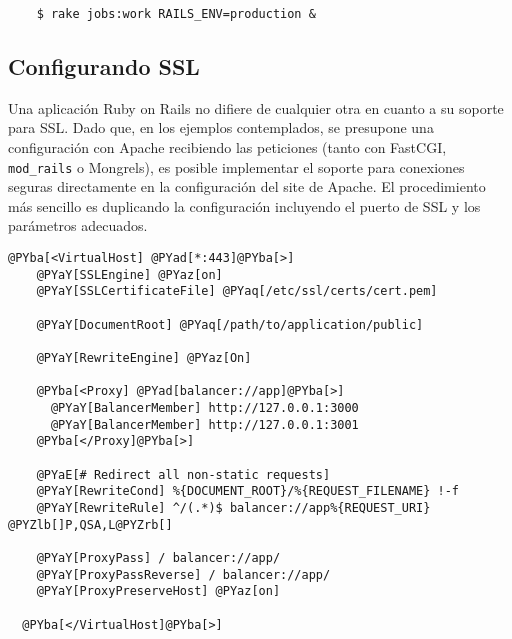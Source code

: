 \begin{verbatim}
	$ rake jobs:work RAILS_ENV=production &
\end{verbatim}


\subsection{Configurando SSL} %
\label{sub:configurando_ssl}

Una aplicación Ruby on Rails no difiere de cualquier otra en cuanto a su soporte para SSL. Dado que, en los ejemplos contemplados, se presupone una configuración con Apache recibiendo las peticiones (tanto con FastCGI, \texttt{mod\_rails} o Mongrels), es posible implementar el soporte para conexiones seguras directamente en la configuración del site de Apache. El procedimiento más sencillo es duplicando la configuración incluyendo el puerto de SSL y los parámetros adecuados.

%
%
%
%    
%
%

\begin{Verbatim}[commandchars=@\[\]]
  @PYba[<VirtualHost] @PYad[*:443]@PYba[>]
    @PYaY[SSLEngine] @PYaz[on]
    @PYaY[SSLCertificateFile] @PYaq[/etc/ssl/certs/cert.pem]

    @PYaY[DocumentRoot] @PYaq[/path/to/application/public]

    @PYaY[RewriteEngine] @PYaz[On]

    @PYba[<Proxy] @PYad[balancer://app]@PYba[>]
      @PYaY[BalancerMember] http://127.0.0.1:3000
      @PYaY[BalancerMember] http://127.0.0.1:3001
    @PYba[</Proxy]@PYba[>]
    
    @PYaE[# Redirect all non-static requests]
    @PYaY[RewriteCond] %{DOCUMENT_ROOT}/%{REQUEST_FILENAME} !-f
    @PYaY[RewriteRule] ^/(.*)$ balancer://app%{REQUEST_URI} @PYZlb[]P,QSA,L@PYZrb[]

    @PYaY[ProxyPass] / balancer://app/
    @PYaY[ProxyPassReverse] / balancer://app/
    @PYaY[ProxyPreserveHost] @PYaz[on]

  @PYba[</VirtualHost]@PYba[>]
\end{Verbatim}


